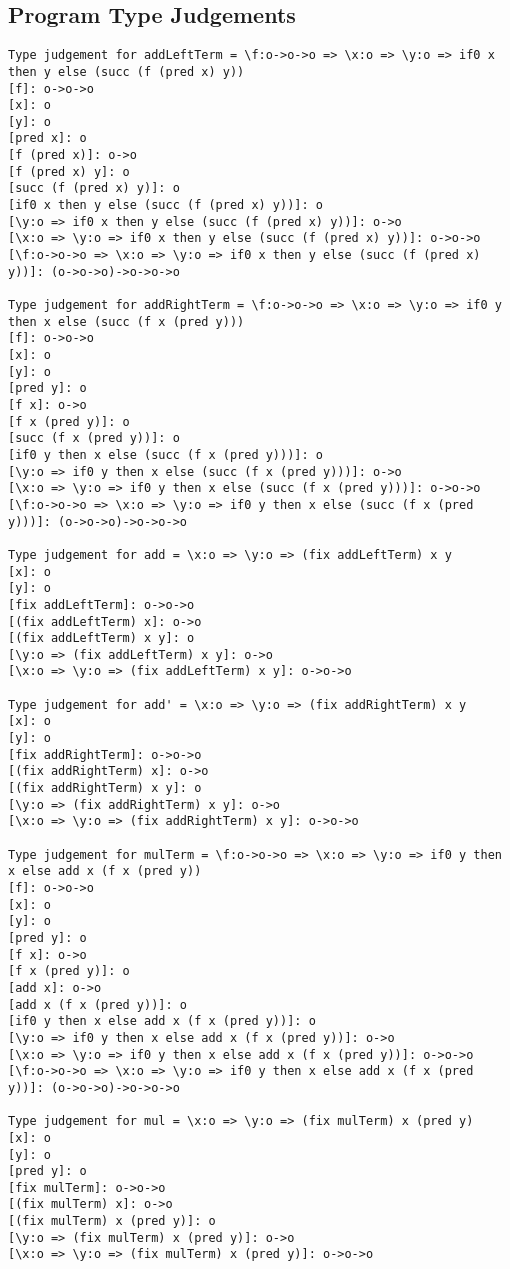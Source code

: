 \documentclass[12pt,a4paper]{report}
\theoremstyle{definition}
\theoremstyle{remark}
\begin{document}
\subsection{Program Type Judgements}
\begin{verbatim}
Type judgement for addLeftTerm = \f:o->o->o => \x:o => \y:o => if0 x then y else (succ (f (pred x) y))
[f]: o->o->o
[x]: o
[y]: o
[pred x]: o
[f (pred x)]: o->o
[f (pred x) y]: o
[succ (f (pred x) y)]: o
[if0 x then y else (succ (f (pred x) y))]: o
[\y:o => if0 x then y else (succ (f (pred x) y))]: o->o
[\x:o => \y:o => if0 x then y else (succ (f (pred x) y))]: o->o->o
[\f:o->o->o => \x:o => \y:o => if0 x then y else (succ (f (pred x) y))]: (o->o->o)->o->o->o

Type judgement for addRightTerm = \f:o->o->o => \x:o => \y:o => if0 y then x else (succ (f x (pred y)))
[f]: o->o->o
[x]: o
[y]: o
[pred y]: o
[f x]: o->o
[f x (pred y)]: o
[succ (f x (pred y))]: o
[if0 y then x else (succ (f x (pred y)))]: o
[\y:o => if0 y then x else (succ (f x (pred y)))]: o->o
[\x:o => \y:o => if0 y then x else (succ (f x (pred y)))]: o->o->o
[\f:o->o->o => \x:o => \y:o => if0 y then x else (succ (f x (pred y)))]: (o->o->o)->o->o->o

Type judgement for add = \x:o => \y:o => (fix addLeftTerm) x y
[x]: o
[y]: o
[fix addLeftTerm]: o->o->o
[(fix addLeftTerm) x]: o->o
[(fix addLeftTerm) x y]: o
[\y:o => (fix addLeftTerm) x y]: o->o
[\x:o => \y:o => (fix addLeftTerm) x y]: o->o->o

Type judgement for add' = \x:o => \y:o => (fix addRightTerm) x y
[x]: o
[y]: o
[fix addRightTerm]: o->o->o
[(fix addRightTerm) x]: o->o
[(fix addRightTerm) x y]: o
[\y:o => (fix addRightTerm) x y]: o->o
[\x:o => \y:o => (fix addRightTerm) x y]: o->o->o

Type judgement for mulTerm = \f:o->o->o => \x:o => \y:o => if0 y then x else add x (f x (pred y))
[f]: o->o->o
[x]: o
[y]: o
[pred y]: o
[f x]: o->o
[f x (pred y)]: o
[add x]: o->o
[add x (f x (pred y))]: o
[if0 y then x else add x (f x (pred y))]: o
[\y:o => if0 y then x else add x (f x (pred y))]: o->o
[\x:o => \y:o => if0 y then x else add x (f x (pred y))]: o->o->o
[\f:o->o->o => \x:o => \y:o => if0 y then x else add x (f x (pred y))]: (o->o->o)->o->o->o

Type judgement for mul = \x:o => \y:o => (fix mulTerm) x (pred y)
[x]: o
[y]: o
[pred y]: o
[fix mulTerm]: o->o->o
[(fix mulTerm) x]: o->o
[(fix mulTerm) x (pred y)]: o
[\y:o => (fix mulTerm) x (pred y)]: o->o
[\x:o => \y:o => (fix mulTerm) x (pred y)]: o->o->o


\end{verbatim}
\end{document}
